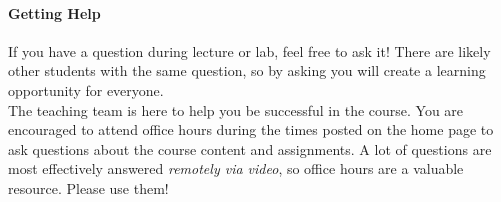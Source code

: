 \documentclass[11pt]{article}
\begin{document}



\paragraph{Getting Help}

If you have a question during lecture or lab, feel free to ask it! There are likely other students with the same question, so by asking you will create a learning opportunity for everyone. \\ 

The teaching team is here to help you be successful in the course. You are encouraged to attend office hours during the times posted on the home page to ask questions about the course content and assignments. A lot of questions are most effectively answered \emph{remotely via video}, so office hours are a valuable resource. Please use them! \\ 
\end{document}
